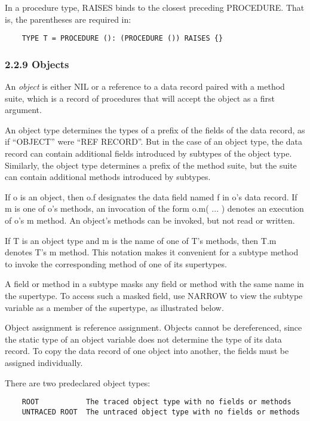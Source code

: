 \documentclass[10pt]{article}
\begin{document}
In a procedure type, RAISES binds to the closest preceding PROCEDURE. That is, the parentheses are required in:
\begin{verbatim}
    TYPE T = PROCEDURE (): (PROCEDURE ()) RAISES {}
\end{verbatim}

\subsubsection*{2.2.9 Objects}

An \emph{object} is either NIL or a reference to a data record paired with a
method suite, which is a record of procedures that will accept the object as a
first argument.

An object type determines the types of a prefix of the fields of the data
record, as if ``OBJECT'' were ``REF RECORD''. But in the case of an object
type, the data record can contain additional fields introduced by subtypes of
the object type. Similarly, the object type determines a prefix of the method
suite, but the suite can contain additional methods introduced by subtypes.

If o is an object, then o.f designates the data field named f in o's data
record. If m is one of o's methods, an invocation of the form o.m( ... )
denotes an execution of o's m method. An object's methods can be invoked, but
not read or written.

If T is an object type and m is the name of one of T's methods, then T.m
denotes T's m method. This notation makes it convenient for a subtype method
to invoke the corresponding method of one of its supertypes.

A field or method in a subtype masks any field or method with the same name in
the supertype. To access such a masked field, use NARROW to view the subtype
variable as a member of the supertype, as illustrated below.

Object assignment is reference assignment. Objects cannot be dereferenced,
since the static type of an object variable does not determine the type of its
data record. To copy the data record of one object into another, the fields
must be assigned individually.

There are two predeclared object types:
\begin{verbatim}
    ROOT           The traced object type with no fields or methods
    UNTRACED ROOT  The untraced object type with no fields or methods
\end{verbatim}
\end{document}
